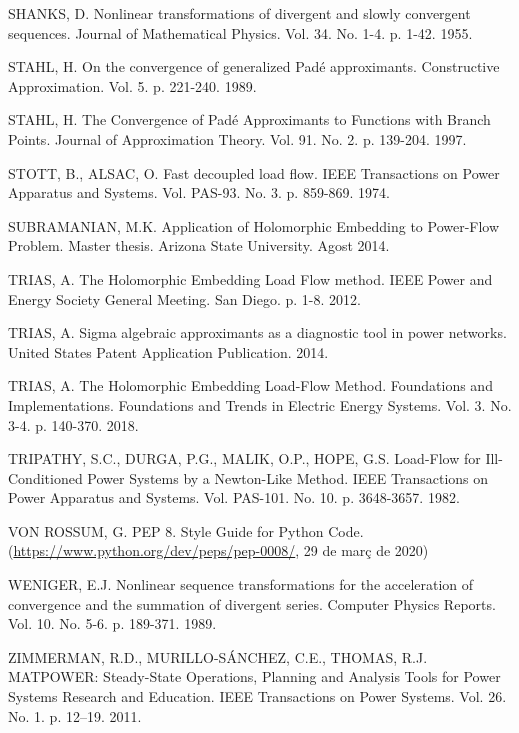 SHANKS, D. Nonlinear transformations of divergent and slowly convergent sequences. Journal of Mathematical Physics. Vol. 34. No. 1-4. p. 1-42. 1955. %

STAHL, H. On the convergence of generalized Padé approximants. Constructive Approximation. Vol. 5. p. 221-240. 1989.

STAHL, H. The Convergence of Padé Approximants to Functions with Branch Points. Journal of Approximation Theory. Vol. 91. No. 2. p. 139-204. 1997.

STOTT, B., ALSAC, O. Fast decoupled load flow. IEEE Transactions on Power Apparatus and Systems. Vol. PAS-93. No. 3. p. 859-869. 1974.

SUBRAMANIAN, M.K. Application of Holomorphic Embedding to Power-Flow Problem. Master thesis. Arizona State University. Agost 2014.

TRIAS, A. The Holomorphic Embedding Load Flow method. IEEE Power and Energy Society General Meeting. San Diego. p. 1-8. 2012.

TRIAS, A. Sigma algebraic approximants as a diagnostic tool in power networks. United States Patent Application Publication. 2014.

TRIAS, A. The Holomorphic Embedding Load-Flow Method. Foundations and Implementations. Foundations and Trends in Electric Energy Systems. Vol. 3. No. 3-4. p. 140-370. 2018.

TRIPATHY, S.C., DURGA, P.G., MALIK, O.P., HOPE, G.S. Load-Flow for Ill-Conditioned Power Systems by a Newton-Like Method. IEEE Transactions on Power Apparatus and Systems. Vol. PAS-101. No. 10. p. 3648-3657. 1982.

VON ROSSUM, G. PEP 8. Style Guide for Python Code. (\url{https://www.python.org/dev/peps/pep-0008/}, 29 de març de 2020)

WENIGER, E.J. Nonlinear sequence transformations for the acceleration of convergence and the summation of divergent series. Computer Physics Reports. Vol. 10. No. 5-6. p. 189-371. 1989.

ZIMMERMAN, R.D., MURILLO-SÁNCHEZ, C.E., THOMAS, R.J. MATPOWER: Steady-State Operations, Planning and Analysis Tools for Power Systems Research and Education. IEEE Transactions on Power Systems. Vol. 26. No. 1. p. 12–19. 2011.


